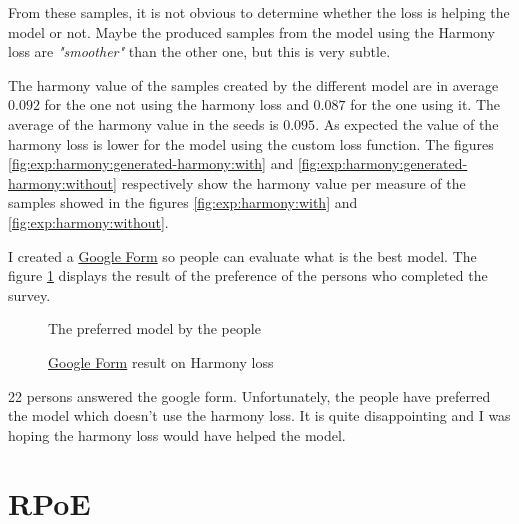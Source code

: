 \documentclass[12pt]{report}
\begin{document}
From these samples, it is not obvious to determine whether the loss is helping the model or not.
Maybe the produced samples from the model using the Harmony loss are \textit{"smoother"} than the other one, but this is very subtle.

The harmony value of the samples created by the different model are in average $0.092$ for the one not using the harmony loss and $0.087$ for the one using it.
The average of the harmony value in the seeds is $0.095$.
As expected the value of the harmony loss is lower for the model using the custom loss function.
The figures \ref{fig:exp:harmony:generated-harmony:with} and \ref{fig:exp:harmony:generated-harmony:without} respectively show the harmony value per measure of the samples showed in the figures \ref{fig:exp:harmony:with} and \ref{fig:exp:harmony:without}.

I created a \href{https://docs.google.com/forms/d/e/1FAIpQLScZ1ZAkCxwIRiuewNlDUFgZcpEY2O-Yg0T8IEQzp4k9_BCCJg/viewform?usp=sf_link}{Google Form} so people can evaluate what is the best model.
The figure \ref{fig:pie:harmony} displays the result of the preference of the persons who completed the survey.

\begin{figure}
    \begin{center}
    \caption{\href{https://docs.google.com/forms/d/e/1FAIpQLScZ1ZAkCxwIRiuewNlDUFgZcpEY2O-Yg0T8IEQzp4k9_BCCJg/viewform?usp=sf_link}{Google Form} result on Harmony loss}
    The preferred model by the people
    \label{fig:pie:harmony}
    \end{center}
\end{figure}

22 persons answered the google form.
Unfortunately, the people have preferred the model which doesn't use the harmony loss.
It is quite disappointing and I was hoping the harmony loss would have helped the model.


\section{RPoE}
\label{sec:exp:rpoe}
\end{document}

